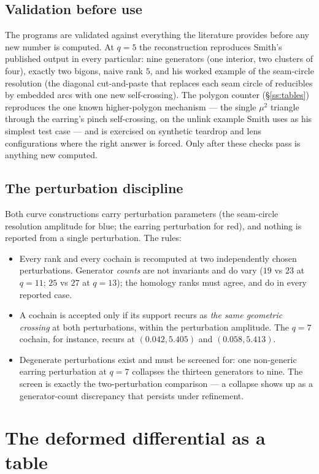 \documentclass[11pt,reqno]{amsart}
\theoremstyle{plain}
\theoremstyle{definition}
\begin{document}
\subsection{Validation before use}\label{ss:gates}
The programs are validated against everything the literature provides before any new number is
computed. At $q=5$ the reconstruction reproduces Smith's published output \cite{Smi} in every particular:
nine generators (one interior, two clusters of four), exactly two bigons, naive rank $5$, and
his worked example of the seam-circle resolution (the diagonal cut-and-paste that replaces each
seam circle of reducibles by embedded arcs with one new self-crossing). The polygon counter
(\S\ref{ss:tables}) reproduces
the one known higher-polygon mechanism --- the single $\mu^2$ triangle through the earring's
pinch self-crossing, on the unlink example Smith uses as his simplest test case --- and is
exercised on synthetic teardrop and lens configurations
where the right answer is forced. Only after these checks pass is anything new computed.

\subsection{The perturbation discipline}\label{ss:pert}
Both curve constructions carry perturbation parameters (the seam-circle resolution amplitude
for blue; the earring perturbation for red), and nothing is reported from a single
perturbation. The rules:
\begin{itemize}
\item Every rank and every cochain is recomputed at two independently chosen perturbations.
Generator \emph{counts} are not invariants and do vary ($19$ vs $23$ at $q=11$; $25$ vs $27$
at $q=13$); the homology ranks must agree, and do in every reported case.
\item A cochain is accepted only if its support recurs as \emph{the same geometric crossing}
at both perturbations, within the perturbation amplitude. The $q=7$ cochain, for instance,
recurs at $(0.042,5.405)$ and $(0.058,5.413)$.
\item Degenerate perturbations exist and must be screened for: one non-generic earring
perturbation at $q=7$ collapses the thirteen generators to nine. The screen is exactly the
two-perturbation comparison --- a collapse shows up as a generator-count discrepancy that
persists under refinement.
\end{itemize}

\section{The deformed differential as a table}\label{sec:deformed}
\end{document}
